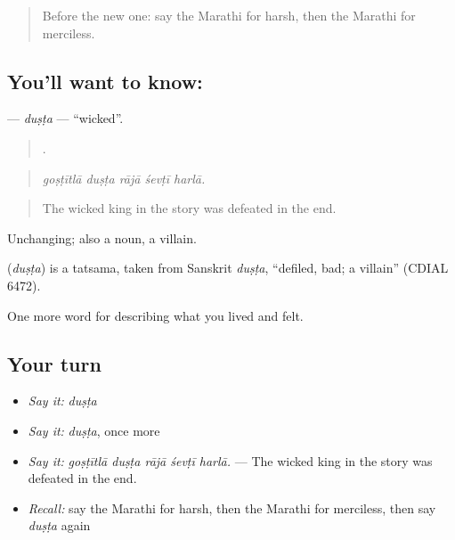 \label{lesson:MR-C469-dusta}



\begin{quote}
Before the new one: say the Marathi for harsh, then the Marathi for merciless.
\end{quote}

\subsection*{You'll want to know: }
\textbf{} — \emph{duṣṭa} — \textquotedblleft{}wicked\textquotedblright{}.

\begin{quote}
    .
\end{quote}

\begin{quote}
\emph{goṣṭītlā duṣṭa rājā śevṭī harlā.}
\end{quote}

\begin{quote}
The wicked king in the story was defeated in the end.
\end{quote}

Unchanging; also a noun, a villain.

\begin{cousinweb}
\textbf{} (\emph{duṣṭa}) is a tatsama, taken from Sanskrit \emph{duṣṭa}, \textquotedblleft{}defiled, bad; a villain\textquotedblright{} (CDIAL 6472).
\end{cousinweb}

\begin{grammarlens}[title={What you've built}]
One more word for describing what you lived and felt.
\end{grammarlens}

\subsection*{Your turn}
\begin{itemize}
\raggedright
  \item \emph{Say it:} \emph{duṣṭa}
  \item \emph{Say it:} \emph{duṣṭa}, once more
  \item \emph{Say it:} \emph{goṣṭītlā duṣṭa rājā śevṭī harlā.} — The wicked king in the story was defeated in the end.
  \item \emph{Recall:} say the Marathi for harsh, then the Marathi for merciless, then say \emph{duṣṭa} again
\end{itemize}

